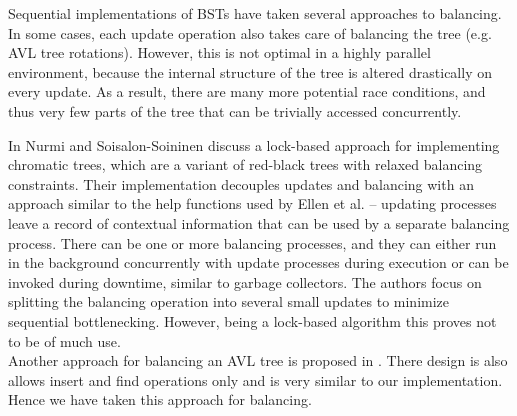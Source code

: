 \documentclass[10pt,pdftex,a4paper]{article}%
\begin{document}
\begin{multicols}{2}
Sequential implementations of BSTs have taken several approaches to balancing.  In some cases, each update operation also takes care of balancing the tree (e.g. AVL tree rotations). However, this is not optimal in a highly parallel environment, because the internal structure of the tree is altered drastically on every update.  As a result, there are many more potential race conditions, and thus very few parts of the tree that can be trivially accessed concurrently.

In \cite{nurmi} Nurmi and Soisalon-Soininen discuss a lock-based approach for implementing chromatic trees, which are a variant of red-black trees with relaxed balancing constraints.  Their implementation decouples updates and balancing with an approach similar to the help functions used by Ellen et al. -- updating processes leave a record of contextual information that can be used by a separate balancing process.  There can be one or more balancing processes, and they can either run in the background concurrently with update processes during execution or can be invoked during downtime, similar to garbage collectors.  The authors focus on splitting the balancing operation into several small updates to minimize sequential bottlenecking. However, being a lock-based algorithm this proves not to be of much use.\\
Another approach for balancing an AVL tree is proposed in \cite{kessels}. There design is also allows insert and find operations only and is very similar to our implementation. Hence we have taken this approach for balancing.

\medskip





\end{multicols}
\end{document}
